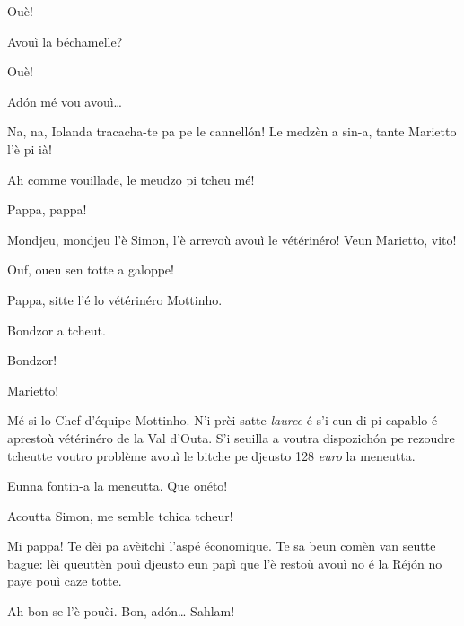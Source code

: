 \begin{drama}
\Iolandaspeaks Ouè!

\Mariettospeaks Avouì la béchamelle?

\Iolandaspeaks Ouè!

\Mariettospeaks {} Ad\'on mé vou avouì\ldots

\Cienspeaks {} Na, na, Iolanda tracacha-te pa pe le cannell\'on! Le medzèn a sin-a, tante Marietto l'è pi ià!

\Iolandaspeaks Ah comme vouillade, le meudzo pi tcheu mé!


\Simonspeaks {} Pappa, pappa!

\Cienspeaks Mondjeu, mondjeu l'è Simon, l'è arrevoù avouì le vétérinéro! Veun Marietto, vito!

\Mariettospeaks Ouf, oueu sen totte a galoppe!


\Simonspeaks {} Pappa, sitte l’é lo vétérinéro Mottinho.

\Chefspeaks {} Bondzor a tcheut. 

\Simonspeaks {} Bondzor!

\Mariettospeaks Marietto!

\Chefspeaks Mé si lo Chef d’équipe Mottinho. N'i prèi satte \textit{lauree} é s’i eun di pi capablo é aprestoù vétérinéro de la Val d'Outa. S’i seuilla a voutra dispozich\'on pe rezoudre tcheutte voutro problème avouì le bitche pe djeusto 128 \textit{euro} la meneutta.

\Mariettospeaks {} Eunna fontin-a la meneutta. Que onéto!


\Cienspeaks {} Acoutta Simon,  me semble tchica tcheur!

\Simonspeaks Mi pappa! Te dèi pa avèitchì l'aspé économique. Te sa beun comèn van seutte bague: lèi queuttèn pouì djeusto eun papì que l’è restoù avouì no é la Réj\'on no paye pouì caze totte.

\Cienspeaks Ah bon se l’è pouèi. Bon, ad\'on\ldots {} Sahlam!


\end{drama}

